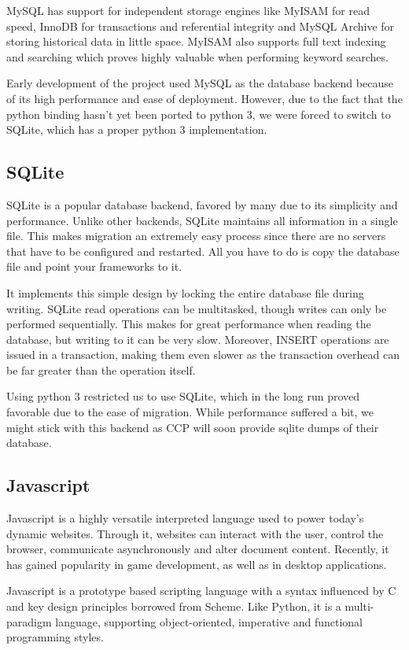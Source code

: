 MySQL has support for independent storage engines like MyISAM for read speed, InnoDB for transactions and referential integrity and MySQL Archive for storing historical data in little space. MyISAM also supports full text indexing and searching which proves highly valuable when performing keyword searches.

Early development of the project used MySQL as the database backend because of its high performance and ease of deployment. However, due to the fact that the python binding hasn’t yet been ported to python 3, we were forced to switch to SQLite, which has a proper python 3 implementation.

\subsection{SQLite}
SQLite \cite{sqlite} is a popular database backend, favored by many due to its simplicity and performance. Unlike other backends, SQLite maintains all information in a single file. This makes migration an extremely easy process since there are no servers that have to be configured and restarted. All you have to do is copy the database file and point your frameworks to it.

It implements this simple design by locking the entire database file during writing. SQLite read operations can be multitasked, though writes can only be performed sequentially. This makes for great performance when reading the database, but writing to it can be very slow. Moreover, INSERT operations are issued in a transaction, making them even slower as the transaction overhead can be far greater than the operation itself.

Using python 3 restricted us to use SQLite, which in the long run proved favorable due to the ease of migration. While performance suffered a bit, we might stick with this backend as CCP will soon provide sqlite dumps of their database.

\subsection{Javascript}
Javascript \cite{javascript} is a highly versatile interpreted language used to power today’s dynamic websites. Through it, websites can interact with the user, control the browser, communicate asynchronously and alter document content. Recently, it has gained popularity in game development, as well as in desktop applications.

Javascript is a prototype based scripting language with a syntax influenced by C and key design principles borrowed from Scheme. Like Python, it is a multi-paradigm language, supporting object-oriented, imperative and functional programming styles.


